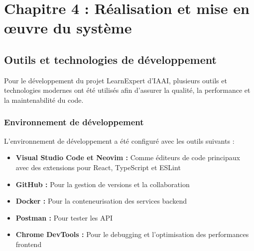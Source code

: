 \chapter*{Chapitre 4 : Réalisation et mise en œuvre du système}
\thispagestyle{fancy}
\setcounter{section}{0}
\newpage

\section{Outils et technologies de développement}
Pour le développement du projet LearnExpert d'IAAI, plusieurs outils et technologies modernes ont été utilisés afin d'assurer la qualité, la performance et la maintenabilité du code.

\subsection{Environnement de développement}
L'environnement de développement a été configuré avec les outils suivants :
\begin{itemize}
  \item \textbf{Visual Studio Code et Neovim :} Comme éditeurs de code principaux avec des extensions pour React, TypeScript et ESLint
  \item \textbf{GitHub :} Pour la gestion de versions et la collaboration
  \item \textbf{Docker :} Pour la conteneurisation des services backend
  \item \textbf{Postman :} Pour tester les API
  \item \textbf{Chrome DevTools :} Pour le debugging et l'optimisation des performances frontend
\end{itemize}

